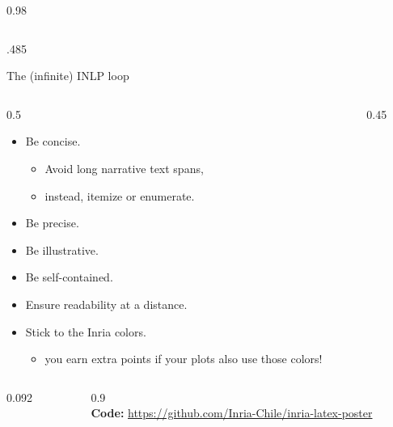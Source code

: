 \documentclass[final,svgnames,english]{beamer}
\begin{document}
\begin{frame}[fragile]{}
\begin{columns}[T]
\begin{column}{0.98\linewidth}
\begin{columns}[T]
\begin{column}{.485\linewidth}
          \begin{inriablock}{The (infinite) INLP loop}
            \begin{columns}[T]
              \begin{column}{0.5\textwidth}
                \begin{itemize}
                  \item Be concise.
                    \begin{itemize}
                      \item Avoid long narrative text spans,
                      \item instead, itemize or enumerate.
                    \end{itemize}
                  \item Be precise.
                  \item Be illustrative.
                  \item Be self-contained.
                  \item Ensure readability at a distance.
                  \item Stick to the Inria colors.
                    \begin{itemize}
                      \item you earn extra points if your plots also use those colors!
                    \end{itemize}
                \end{itemize}
              \end{column}
              \begin{column}{0.45\textwidth}
                \centering
                
              \end{column}
            \end{columns}
          \end{inriablock}

          \begin{plainblock}{}
            \begin{columns}[c]
              \begin{column}{0.092\textwidth}
              \end{column}
              \begin{column}{0.9\textwidth}%
                {\linespread{0.83}\footnotesize{}\\[-1.28ex]
                \textbf{Code:} \url{https://github.com/Inria-Chile/inria-latex-poster}}
              \end{column}
            \end{columns}
          \end{plainblock}
        \end{column}


\end{columns}
\end{column}
\end{columns}
\end{frame}
\end{document}
